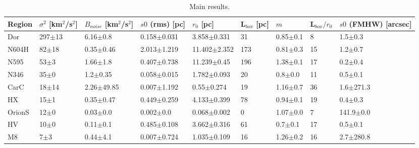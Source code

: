 \begin{table}
\centering
\caption{Main results.}
\begin{tabular}{lllllllll}
\toprule
 Region & $\sigma^2$ [km$^2$/s$^2$] & $B_{noise}$ [km$^2$/s$^2$] &  $s0$ (rms) [pc] &        $r_0$ [pc] & L$_{box}$ [pc] &           $m$ & L$_{box} / r_0$ & $s0$ (FMHW) [arcsec] \\
\midrule
    Dor &                297$\pm$13 &               6.16$\pm$0.8 &  0.158$\pm$0.031 &   3.858$\pm$0.331 &             31 &  0.85$\pm$0.1 &               8 &          1.5$\pm$0.3 \\
  N604H &                 82$\pm$18 &              0.35$\pm$0.46 &  2.013$\pm$1.219 &  11.402$\pm$2.352 &            173 &  0.81$\pm$0.3 &              15 &          1.2$\pm$0.7 \\
   N595 &                  53$\pm$3 &               1.66$\pm$1.8 &  0.407$\pm$0.738 &   11.239$\pm$0.45 &            196 &  1.38$\pm$0.1 &              17 &          0.2$\pm$0.4 \\
   N346 &                  35$\pm$0 &               1.2$\pm$0.35 &  0.058$\pm$0.015 &   1.782$\pm$0.093 &             20 &   0.8$\pm$0.0 &              11 &          0.5$\pm$0.1 \\
   CarC &                 18$\pm$14 &             2.26$\pm$49.85 &  0.007$\pm$1.192 &    0.55$\pm$0.274 &             19 &  1.16$\pm$0.7 &              36 &        1.6$\pm$271.3 \\
     HX &                  15$\pm$1 &              0.35$\pm$0.47 &  0.449$\pm$0.259 &   4.133$\pm$0.399 &             78 &  0.94$\pm$0.1 &              19 &          0.4$\pm$0.3 \\
 OrionS &                  12$\pm$0 &               0.03$\pm$0.0 &    0.002$\pm$0.0 &   0.068$\pm$0.002 &              0 &  1.07$\pm$0.0 &               7 &        141.9$\pm$0.0 \\
     HV &                  10$\pm$0 &               0.11$\pm$0.1 &  0.485$\pm$0.108 &   3.662$\pm$0.316 &             61 &   0.7$\pm$0.1 &              17 &          0.5$\pm$0.1 \\
     M8 &                   7$\pm$3 &               0.44$\pm$4.1 &  0.007$\pm$0.724 &   1.035$\pm$0.109 &             16 &  1.26$\pm$0.2 &              16 &        2.7$\pm$280.8 \\
\bottomrule
\end{tabular}
\end{table}
